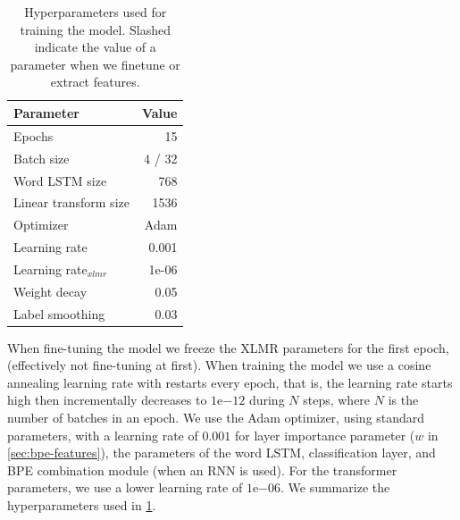 \documentclass[11pt]{article}
\begin{document}
    	\begin{table}
		\centering
		\begin{tabular}{lr} \\
			Parameter & Value \\
			\hline
			Epochs & 15 \\
			Batch size & 4 / 32 \\
            Word LSTM size & 768 \\
            Linear transform size & 1536 \\
			Optimizer & Adam \\
			Learning rate & 0.001 \\
			Learning rate$_{xlmr}$ & 1e-06 \\
            Weight decay & 0.05 \\
			Label smoothing & 0.03 \\
		\end{tabular}
    		\caption{\label{tab:parameters} Hyperparameters used for
     training the model. Slashed indicate the value of a parameter
     when we finetune or extract features.}
	\end{table}
     
         When fine-tuning the model we freeze the XLMR parameters for
     the first epoch, (effectively not fine-tuning at first).  When training the model we use a cosine annealing learning
     rate with restarts every epoch, that is, the learning rate starts
     high then incrementally decreases to $1\mathrm{e}{-12}$ during
     $N$ steps, where $N$ is the number of batches in an epoch. We use
     the Adam optimizer, using standard parameters, with a learning
     rate of $0.001$ for layer importance parameter ($w$ in
     \cref{sec:bpe-features}), the parameters of the word LSTM,
     classification layer, and BPE combination module (when an RNN is
     used). For the transformer parameters, we use a lower learning
     rate of $1\mathrm{e}{-06}$. We summarize the hyperparameters used
     in \cref{tab:parameters}.
\end{document}
